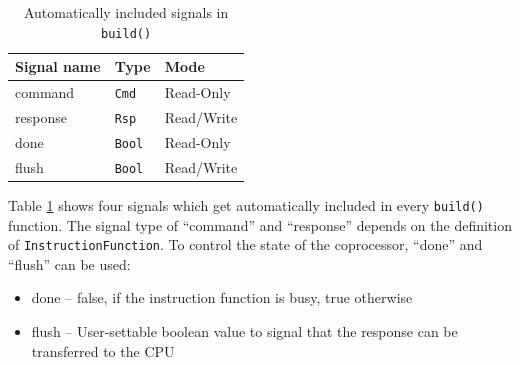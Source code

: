 \documentclass[twoside,twocolumn]{article}
\newcommand{\code}[1]{\texttt{#1}}
\begin{document}
\begin{table}[h]
\centering
\begin{tabular}{lll}
    Signal name & Type & Mode \\
    \hline
    command & \code{Cmd} & Read-Only \\
    response & \code{Rsp} & Read/Write\\
    done & \code{Bool} & Read-Only\\
    flush & \code{Bool} & Read/Write
\end{tabular}
    \caption{Automatically included signals in \code{build()}}
    \label{tab:signals}
\end{table}
\noindent Table \ref*{tab:signals} shows four signals which get automatically
included in every \code{build()} function. The signal type of
``command''
and ``response'' depends on the definition of
\code{InstructionFunction}. To control the state of the coprocessor,
``done'' and ``flush'' can be used:
\begin{itemize}
    \item done -- false, if the instruction function is busy, true
        otherwise
    \item flush -- User-settable boolean value to signal that the response
        can be transferred to the CPU
\end{itemize}
\end{document}
